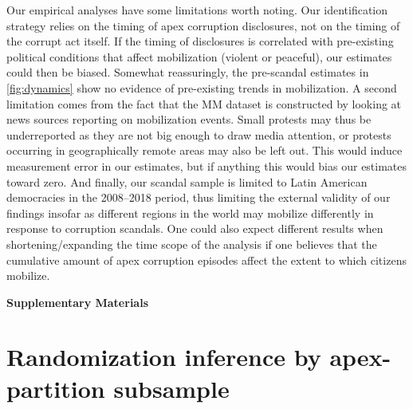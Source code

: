 \documentclass[11pt]{article}
\begin{document}
Our empirical analyses have some limitations worth noting. Our identification strategy relies on the timing of apex corruption disclosures, not on the timing of the corrupt act itself. If the timing of disclosures is correlated with pre-existing political conditions that affect mobilization (violent or peaceful), our estimates could then be biased. Somewhat reassuringly, the pre-scandal estimates in \autoref{fig:dynamics} show no evidence of pre-existing trends in mobilization. A second limitation comes from the fact that the MM dataset is constructed by looking at news sources reporting on mobilization events. Small protests may thus be underreported as they are not big enough to draw media attention, or protests occurring in geographically remote areas may also be left out. This would induce measurement error in our estimates, but if anything this would bias our estimates toward zero. And finally, our scandal sample is limited to Latin American democracies in the 2008--2018 period, thus limiting the external validity of our findings insofar as different regions in the world may mobilize differently in response to corruption scandals. One could also expect different results when shortening/expanding the time scope of the analysis if one believes that the cumulative amount of apex corruption episodes affect the extent to which citizens mobilize.

\clearpage


\clearpage
\appendix
\renewcommand{\thesection}{S\arabic{section}}
\renewcommand{\thesubsection}{S\arabic{section}.\arabic{subsection}}
\renewcommand{\thetable}{S\arabic{table}}
\renewcommand{\thefigure}{S\arabic{figure}}
\setcounter{section}{0}
\setcounter{table}{0}
\setcounter{figure}{0}

\begin{center}
    {\Large\bfseries Supplementary Materials}
\end{center}
\bigskip

\clearpage
\section{Randomization inference by apex-partition subsample}\label{sup:ri}
\end{document}
